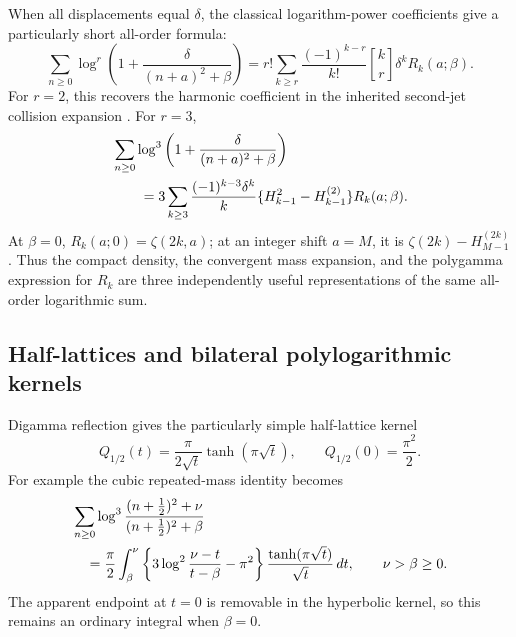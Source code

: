 \documentclass[11pt,letterpaper]{article}
\numberwithin{equation}{section}
\theoremstyle{definition}
\theoremstyle{remark}
\newcommand{\dd}{\,d}
\newcommand{\stir}[2]{\genfrac{[}{]}{0pt}{}{#1}{#2}}
\begin{document}
When all displacements equal \(\delta\), the classical logarithm-power
coefficients give a particularly short all-order formula:
\begin{equation}\label{da:confluent-stirling}
 \boxed{\displaystyle
 \sum_{n\ge0}\log^r\left(1+\frac{\delta}{(n+a)^2+\beta}\right)
   =r!\sum_{k\ge r}\frac{(-1)^{k-r}}{k!}\stir kr
                          \delta^kR_k(a;\beta).}
\end{equation}
For \(r=2\), this recovers the harmonic coefficient in the inherited
second-jet collision expansion \cite{ProveItHigherDefects}. For \(r=3\),
\begin{align}
 &\sum_{n\ge0}\log^3\left(1+\frac{\delta}{(n+a)^2+\beta}\right)\notag\\
 &\qquad=
 3\sum_{k\ge3}\frac{(-1)^{k-3}\delta^k}{k}
       \{H_{k-1}^2-H_{k-1}^{(2)}\}R_k(a;\beta).
 \label{da:cubic-harmonic}
\end{align}
At \(\beta=0\), \(R_k(a;0)=\zeta(2k,a)\); at an integer shift
\(a=M\), it is \(\zeta(2k)-H_{M-1}^{(2k)}\).
Thus the compact density, the convergent mass expansion, and the
polygamma expression for \(R_k\) are three independently useful
representations of the same all-order logarithmic sum.

\subsection{Half-lattices and bilateral polylogarithmic kernels}

Digamma reflection gives the particularly simple half-lattice kernel
\begin{equation}\label{da:half-lattice}
 Q_{1/2}(t)=\frac{\pi}{2\sqrt t}\tanh(\pi\sqrt t),
 \qquad Q_{1/2}(0)=\frac{\pi^2}{2}.
\end{equation}
For example the cubic repeated-mass identity becomes
\begin{align}
 &\sum_{n\ge0}\log^3
    \frac{(n+\frac12)^2+\nu}{(n+\frac12)^2+\beta}\notag\\
 &\quad=\frac{\pi}{2}\int_\beta^\nu
    \left\{3\log^2\frac{\nu-t}{t-\beta}-\pi^2\right\}
                  \frac{\tanh(\pi\sqrt t)}{\sqrt t}\dd t,
       \qquad \nu>\beta\ge0 .
 \label{da:half-cubic}
\end{align}
The apparent endpoint at \(t=0\) is removable in the hyperbolic kernel,
so this remains an ordinary integral when \(\beta=0\).
\end{document}
